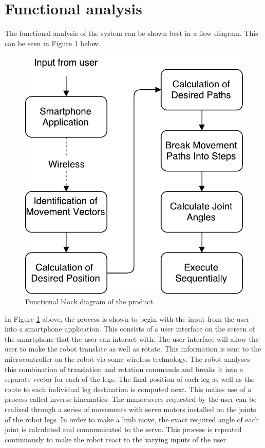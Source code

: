 
\section{Functional analysis}
The functional analysis of the system can be shown best in a flow diagram. This can be seen in Figure \ref{fig:Func} below.

\begin{figure}[H]
\centering
\includegraphics[scale=0.8]{FunctionalDiagram.pdf}
\caption{Functional block diagram of the product.}
\label{fig:Func}
\end{figure}

In Figure \ref{fig:Func} above, the process is shown to begin with the input from the user into a smartphone application. This consists of a user interface on the screen of the smartphone that the user can interact with. The user interface will allow the user to make the robot translate as well as rotate. This information is sent to the microcontroller on the robot via some wireless technology.
The robot analyses this combination of translation and rotation commands and breaks it into a separate vector for each of the legs. The final position of each leg as well as the route to each individual leg destination is computed next. This makes use of a process called inverse kinematics. The manoeuvres requested by the user can be realized through a series of movements with servo motors installed on the joints of the robot legs. In order to make a limb move, the exact required angle of each joint is calculated and communicated to the servo. This process is repeated continuously to make the robot react to the varying inputs of the user.

\newpage


